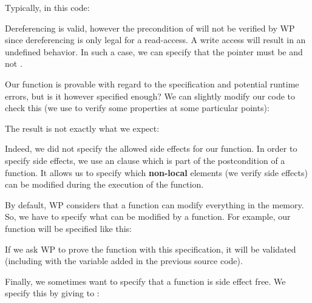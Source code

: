 Typically, in this code:






Dereferencing  is valid, however the precondition of
 will not be verified by WP since dereferencing
 is only legal for a read-access. A write access will
result in an undefined behavior. In such a case, we can specify that the
pointer  must be  and not
.





Our  function is provable with regard to the specification
and potential runtime errors, but is it however specified enough? We can
slightly modify our code to check this (we use  to verify
some properties at some particular points):






The result is not exactly what we expect:





Indeed, we did not specify the allowed side effects for our function. In
order to specify side effects, we use an  clause which is
part of the postcondition of a function. It allows us to specify which
\textbf{non-local} elements (we verify side effects) can be modified
during the execution of the function.



By default, WP considers that a function can modify everything in the
memory. So, we have to specify what can be modified by a function. For
example, our  function will be specified like this:






If we ask WP to prove the function with this specification, it will be
validated (including with the variable added in the previous source
code).



Finally, we sometimes want to specify that a function is side effect
free. We specify this by giving  to
:




